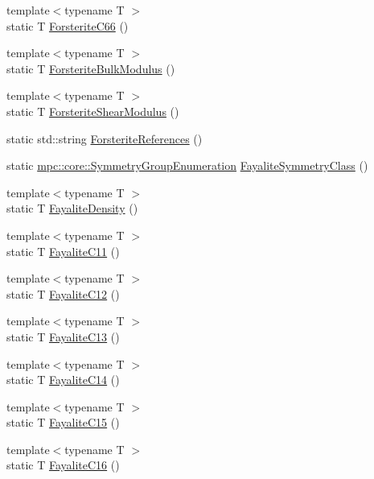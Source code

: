 \begin{DoxyCompactItemize}
{\footnotesize template$<$typename T $>$ }\\static T \mbox{\hyperlink{namespacempc_1_1data_ae7578fb76679b399c76b66329d5f6f57}{Forsterite\+C66}} ()
\item 
{\footnotesize template$<$typename T $>$ }\\static T \mbox{\hyperlink{namespacempc_1_1data_a0c3157192fb6750d295dc73db5253b4b}{Forsterite\+Bulk\+Modulus}} ()
\item 
{\footnotesize template$<$typename T $>$ }\\static T \mbox{\hyperlink{namespacempc_1_1data_a108126c94117a379306d34b24b4167dc}{Forsterite\+Shear\+Modulus}} ()
\item 
static std\+::string \mbox{\hyperlink{namespacempc_1_1data_ad110ad42cf202e8ab9150a773e99ee19}{Forsterite\+References}} ()
\item 
static \mbox{\hyperlink{namespacempc_1_1core_a9d979684062547055a0ef5c13077bad8}{mpc\+::core\+::\+Symmetry\+Group\+Enumeration}} \mbox{\hyperlink{namespacempc_1_1data_a4db255692252d949423c0ad3d1542246}{Fayalite\+Symmetry\+Class}} ()
\item 
{\footnotesize template$<$typename T $>$ }\\static T \mbox{\hyperlink{namespacempc_1_1data_a167621694a2b6f1f86573c0cf98a988b}{Fayalite\+Density}} ()
\item 
{\footnotesize template$<$typename T $>$ }\\static T \mbox{\hyperlink{namespacempc_1_1data_a414c1b1604e7e00eec6c5b26f2ac3a96}{Fayalite\+C11}} ()
\item 
{\footnotesize template$<$typename T $>$ }\\static T \mbox{\hyperlink{namespacempc_1_1data_abc336e16c100e36dd313b0f97ff65070}{Fayalite\+C12}} ()
\item 
{\footnotesize template$<$typename T $>$ }\\static T \mbox{\hyperlink{namespacempc_1_1data_adc1323c9ebd8312fb76e3b08aecbf26d}{Fayalite\+C13}} ()
\item 
{\footnotesize template$<$typename T $>$ }\\static T \mbox{\hyperlink{namespacempc_1_1data_a3463f0c7c97eeb5a56e312c661d7060f}{Fayalite\+C14}} ()
\item 
{\footnotesize template$<$typename T $>$ }\\static T \mbox{\hyperlink{namespacempc_1_1data_ab6a79b00b7bdc98776866eceff149b06}{Fayalite\+C15}} ()
\item 
{\footnotesize template$<$typename T $>$ }\\static T \mbox{\hyperlink{namespacempc_1_1data_a590d59299dd0b06d9c615e6cc28521e4}{Fayalite\+C16}} ()

\end{DoxyCompactItemize}
